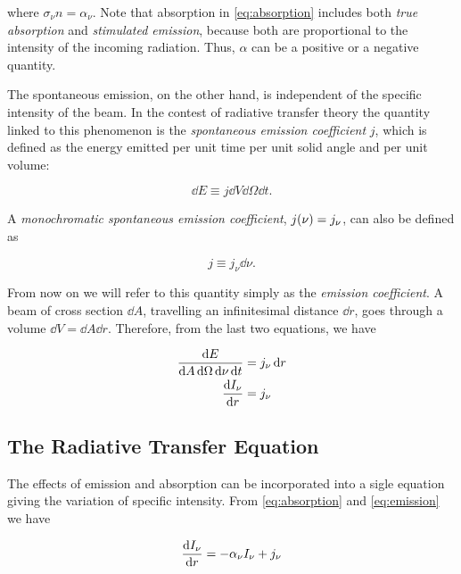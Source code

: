 where $\sigma_\nu n = \alpha_\nu$. Note that absorption in
\autoref{eq:absorption} includes both \emph{true absorption} and
\emph{stimulated emission}, because both are proportional to the intensity
of the incoming radiation. Thus, $\alpha$ can be a positive or a negative
quantity.

The spontaneous emission, on the other hand, is independent of the
specific intensity of the beam. In the contest of radiative transfer theory
the quantity linked to this phenomenon is the \emph{spontaneous emission
coefficient} $j$, which is defined as the energy emitted
per unit time per unit solid angle and per unit volume:

\begin{equation}
        \dd{E} \equiv j\dd{V}\dd{\Omega}\dd{t}.
\end{equation}

A \emph{monochromatic spontaneous emission coefficient}, $j\qty(\nu) =
j_\nu$, can also be defined as

\begin{equation}
        j \equiv j_\nu \dd{\nu}.
\end{equation}

From now on we will refer to this quantity simply as the \emph{emission
coefficient}.
A beam of cross section $\dd{A}$, travelling an infinitesimal distance
$\dd{r}$, goes through a volume $\dd{V} = \dd{A} \dd{r}$. Therefore, from
the last two equations, we have

\begin{equation}
        \begin{split}
        \frac{\dd{E}}{\dd{A}\dd{\Omega}\dd{\nu}\dd{t}} & = j_\nu \dd{r} \\
        \dv{I_\nu}{r} & = j_\nu
        \label{eq:emission}
        \end{split}
\end{equation}

\subsection{The Radiative Transfer Equation}\label{ss:radiative_transfer_eq}

The effects of emission and absorption can be incorporated into a sigle
equation giving the variation of specific intensity. From \autoref{eq:absorption}
and \autoref{eq:emission} we have

\begin{equation}
        \dv{I_\nu}{r} = -\alpha_\nu I_\nu + j_\nu
\end{equation}


